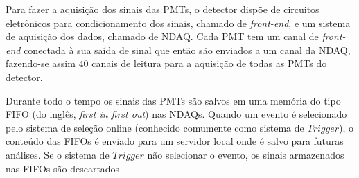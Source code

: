 Para fazer a aquisição dos sinais das PMTs, o detector dispõe de circuitos eletrônicos para condicionamento dos sinais, chamado de \emph{front-end}, e um sistema de aquisição dos dados, chamado de \ac{NDAQ}. Cada PMT tem um canal de \emph{front-end} conectada à sua saída de sinal que então são enviados a um canal da NDAQ, fazendo-se assim $40$ canais de leitura para a aquisição de todas as PMTs do detector.

Durante todo o tempo os sinais das PMTs são salvos em uma memória do tipo FIFO (do inglês, \emph{first in first out}) nas NDAQs. Quando um evento é selecionado pelo sistema de seleção online (conhecido comumente como sistema de $Trigger$), o conteúdo das FIFOs é enviado para um servidor local onde é salvo para futuras análises. Se o sistema de $Trigger$ não selecionar o evento, os sinais armazenados nas FIFOs são descartados

